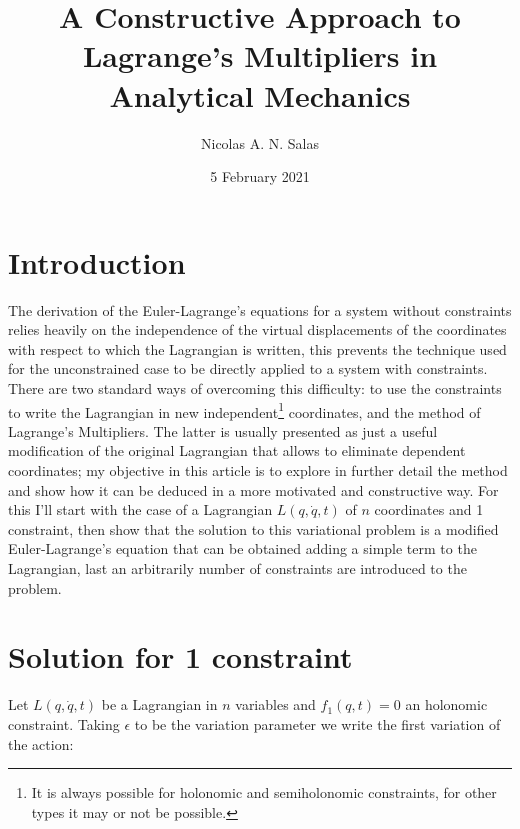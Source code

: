 \documentclass{article}
\title{A Constructive Approach to Lagrange's Multipliers in Analytical Mechanics}
\author{Nicolas A. N. Salas  }
\date{5 February 2021}
\begin{document}
\maketitle

\section{Introduction}
The derivation of the Euler-Lagrange's equations for a system without constraints relies heavily on the independence of the virtual displacements of the coordinates with respect to which the Lagrangian is written, this prevents the technique used for the unconstrained case to be directly applied to a system with constraints. There are two standard ways of overcoming this difficulty: to use the constraints to write the Lagrangian in new independent\footnote{ It is always possible for holonomic and semiholonomic constraints, for other types it may or not be possible. } coordinates, and the method of Lagrange's Multipliers. The latter is usually presented as just a useful modification of the original Lagrangian that allows to eliminate dependent coordinates; my objective in this article is to explore in further detail the method and show how it can be deduced in a more motivated and constructive way. For this I'll start with the case of a Lagrangian $L(q,\dot{q},t)$ of $n$ coordinates and 1 constraint, then show that the solution to this variational problem is a modified Euler-Lagrange's equation that can be obtained adding a simple term to the Lagrangian, last an arbitrarily number of constraints are introduced to the problem.

\section{Solution for 1 constraint}
Let $L(q,\dot{q},t)$ be a Lagrangian in $n$ variables and $f_1(q,t)=0$ an holonomic constraint. Taking $\epsilon$ to be the variation parameter we write the first variation of the action:
\end{document}
